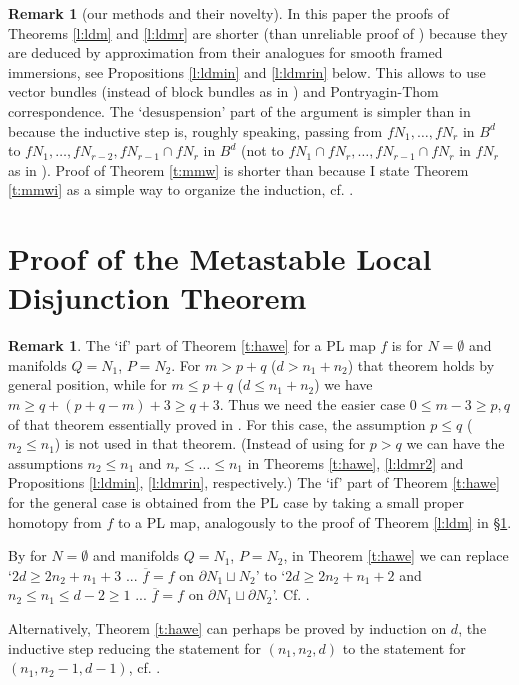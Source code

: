 \documentclass[12pt]{article}
\newcommand{\aronly}[1]{#1}
\theoremstyle{plain}
\theoremstyle{definition}
\newtheorem{Remark}[Theorem]{Remark}
\begin{document}
\begin{Remark}[our methods and their novelty]
In this paper the proofs of Theorems \ref{l:ldm} and \ref{l:ldmr} are shorter (than unreliable proof of \cite[Lemma 10]{MW16}) because they are deduced by approximation from their analogues for smooth framed immersions, see Propositions \ref{l:ldmin} and \ref{l:ldmrin} below.
This allows to use vector bundles (instead of block bundles as in \cite{MW16}) and Pontryagin-Thom correspondence.
The `desuspension' part of the argument is simpler than in \cite{MW16} because the inductive step is, roughly speaking, passing from $fN_1,\ldots,fN_r$ in $B^d$ to $fN_1,\ldots,fN_{r-2},fN_{r-1}\cap fN_r$ in $B^d$ (not to $fN_1\cap fN_r,\ldots,fN_{r-1}\cap fN_r$ in $fN_r$ as in \cite{MW16}).
Proof of Theorem \ref{t:mmw} is shorter than \cite[\S3]{MW16} because I state Theorem \ref{t:mmwi} as a simple
way to organize the induction, cf. \cite[Disjunction Theorem 3.1]{Sk02}.
\end{Remark}





\section{Proof of the Metastable Local Disjunction Theorem}\label{s:meta}

\begin{Remark}\label{r:ifhawe}
The `if' part of Theorem \ref{t:hawe} for a PL map $f$ is \cite[Theorem 1.3]{Sk00} for $N=\emptyset$ and manifolds $Q=N_1$, $P=N_2$.
For $m>p+q$ ($d>n_1+n_2$) that theorem holds by general position, while for $m\le p+q$ ($d\le n_1+n_2$) we have
$m\ge q+(p+q-m)+3\ge q+3$.
Thus we need the easier case $0\le m-3\ge p,q$ of that theorem essentially proved in \cite{We67}.
For this case, the assumption $p\le q$ ($n_2\le n_1$) is not used in that theorem.
(Instead of using \cite[Theorem 1.3]{Sk00} for $p>q$ we can have the assumptions $n_2\le n_1$ and
$n_r\le\ldots\le n_1$ in Theorems \ref{t:hawe}, \ref{l:ldmr2} and Propositions \ref{l:ldmin}, \ref{l:ldmrin}, respectively.)
The `if' part of Theorem \ref{t:hawe} for the general case is obtained from the PL case by taking a small proper homotopy from $f$ to a PL map, analogously to the proof of Theorem \ref{l:ldm} in \S\ref{s:meta}.

\aronly{By \cite[Theorem 1.3]{Sk00} for $N=\emptyset$ and manifolds $Q=N_1$, $P=N_2$, in Theorem \ref{t:hawe} we can replace `$2d\ge2n_2+n_1+3$ ... $\overline f=f$ on $\partial N_1\sqcup N_2$' to `$2d\ge2n_2+n_1+2$ and $n_2\le n_1\le d-2\ge1$ ... $\overline f=f$ on $\partial N_1\sqcup\partial N_2$'.
Cf. \cite[2nd paragraph in p. 3]{Sk02}.

Alternatively, Theorem \ref{t:hawe} can perhaps be proved by induction on $d$, the inductive step reducing the statement for $(n_1,n_2,d)$ to the statement for $(n_1,n_2-1,d-1)$, cf. \cite[\S5]{RS72}.}
\end{Remark}
\end{document}
